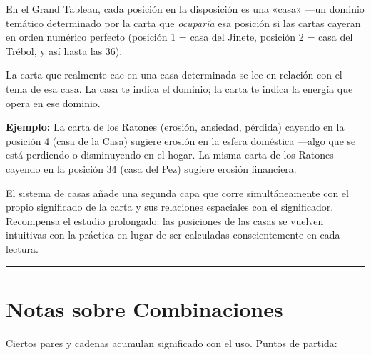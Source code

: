 En el Grand Tableau, cada posición en la disposición es una «casa» ---un dominio temático determinado por la carta que \emph{ocuparía} esa posición si las cartas cayeran en orden numérico perfecto (posición 1 = casa del Jinete, posición 2 = casa del Trébol, y así hasta las 36).

La carta que realmente cae en una casa determinada se lee en relación con el tema de esa casa. La casa te indica el dominio; la carta te indica la energía que opera en ese dominio.

\textbf{Ejemplo:} La carta de los Ratones (erosión, ansiedad, pérdida) cayendo en la posición 4 (casa de la Casa) sugiere erosión en la esfera doméstica ---algo que se está perdiendo o disminuyendo en el hogar. La misma carta de los Ratones cayendo en la posición 34 (casa del Pez) sugiere erosión financiera.

El sistema de casas añade una segunda capa que corre simultáneamente con el propio significado de la carta y sus relaciones espaciales con el significador. Recompensa el estudio prolongado: las posiciones de las casas se vuelven intuitivas con la práctica en lugar de ser calculadas conscientemente en cada lectura.

\begin{center}\rule{0.5\linewidth}{0.5pt}\end{center}

\section{Notas sobre Combinaciones}\label{notes-on-combinations}

Ciertos pares y cadenas acumulan significado con el uso. Puntos de partida:

